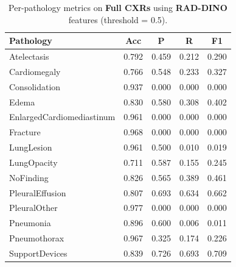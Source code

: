 
\begin{table}[H]
\centering
\small
\begin{tabular}{lcccc}
\toprule
\textbf{Pathology} & \textbf{Acc} & \textbf{P} & \textbf{R} & \textbf{F1} \\
\midrule
Atelectasis               & 0.792 & 0.459 & 0.212 & 0.290 \\
Cardiomegaly              & 0.766 & 0.548 & 0.233 & 0.327 \\
Consolidation             & 0.937 & 0.000 & 0.000 & 0.000 \\
Edema                     & 0.830 & 0.580 & 0.308 & 0.402 \\
EnlargedCardiomediastinum & 0.961 & 0.000 & 0.000 & 0.000 \\
Fracture                  & 0.968 & 0.000 & 0.000 & 0.000 \\
LungLesion                & 0.961 & 0.500 & 0.010 & 0.019 \\
LungOpacity               & 0.711 & 0.587 & 0.155 & 0.245 \\
NoFinding                 & 0.826 & 0.565 & 0.389 & 0.461 \\
PleuralEffusion           & 0.807 & 0.693 & 0.634 & 0.662 \\
PleuralOther              & 0.977 & 0.000 & 0.000 & 0.000 \\
Pneumonia                 & 0.896 & 0.600 & 0.006 & 0.011 \\
Pneumothorax              & 0.967 & 0.325 & 0.174 & 0.226 \\
SupportDevices            & 0.839 & 0.726 & 0.693 & 0.709 \\
\bottomrule
\end{tabular}
\caption{Per-pathology metrics on \textbf{Full CXRs} using \textbf{RAD-DINO} features (threshold = 0.5).}
\label{tab:full_dino}
\end{table}

